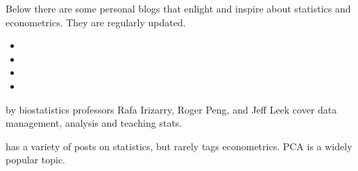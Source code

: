 \documentclass[letterpaper,10pt,english]{sphinxmanual}
\begin{document}
Below there are some personal blogs that enlight and inspire about statistics and econometrics.
They are regularly updated.
\begin{itemize}
\item {} 

\item {} 

\item {} 

\item {} 

\end{itemize}

 by biostatistics
professors Rafa Irizarry, Roger Peng, and Jeff Leek cover data management,
analysis and teaching stats.

 has a variety of posts on statistics, but rarely tags econometrics. PCA is a widely popular topic.
\end{document}
